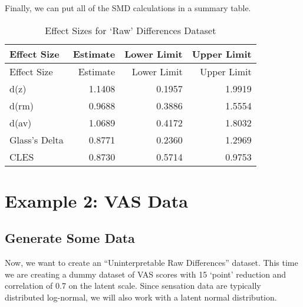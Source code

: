 \documentclass[]{tufte-handout}
\begin{document}
Finally, we can put all of the SMD calculations in a summary table.

\begin{longtable}[]{@{}lrrr@{}}
\caption{Effect Sizes for `Raw' Differences Dataset}\tabularnewline
\toprule
Effect Size & Estimate & Lower Limit & Upper Limit\tabularnewline
\midrule
\endfirsthead
\toprule
Effect Size & Estimate & Lower Limit & Upper Limit\tabularnewline
\midrule
\endhead
d(z) & 1.1408 & 0.1957 & 1.9919\tabularnewline
d(rm) & 0.9688 & 0.3886 & 1.5554\tabularnewline
d(av) & 1.0689 & 0.4172 & 1.8032\tabularnewline
Glass's Delta & 0.8771 & 0.2360 & 1.2969\tabularnewline
CLES & 0.8730 & 0.5714 & 0.9753\tabularnewline
\bottomrule
\end{longtable}

\hypertarget{example-2-vas-data}{%
\section{Example 2: VAS Data}\label{example-2-vas-data}}

\hypertarget{generate-some-data-1}{%
\subsection{Generate Some Data}\label{generate-some-data-1}}

Now, we want to create an ``Uninterpretable Raw Differences'' dataset.
This time we are creating a dummy dataset of VAS scores with 15 `point'
reduction and correlation of 0.7 on the latent scale. Since sensation
data are typically distributed log-normal, we will also work with a
latent normal distribution.
\end{document}
